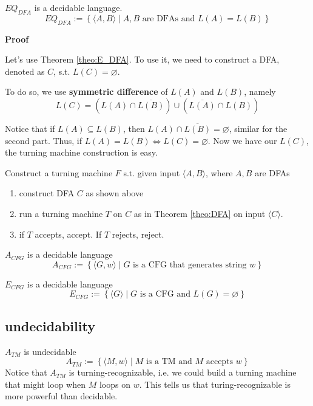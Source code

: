 \documentclass[a4paper]{article}
\begin{document}
\begin{Theorem}{$EQ_{DFA}$ is a decidable language.}{}
	\[
		EQ_{DFA} := \left\{ \langle A,B \rangle \mid A,B \text{ are DFAs and } L(A) = L(B)  \right\} 
	\] 
\end{Theorem}

\textbf{Proof}

Let's use Theorem \ref{theo:E_DFA}. To use it, we need to construct a DFA, denoted as $C$, s.t. $L(C) = \varnothing$.

To do so, we use \textbf{symmetric difference} of $L(A)$ and  $L(B)$, namely  \[
	L(C) = \left( L(A) \cap \overline{L(B)} \right) \cup \left( \overline{L(A)} \cap L(B) \right)  
\]  

Notice that if $L(A) \subseteq L(B)$, then $L(A) \cap \overline{L(B)} = \varnothing$, similar for the second part. Thus, if $L(A) = L(B) \iff L(C) = \varnothing$. Now we have our $L(C)$, the turning machine construction is easy.

Construct a turning machine  $F$ s.t. given input  $\langle A,B \rangle $, where $A,B$ are DFAs
 \begin{enumerate}
	 \item construct DFA $C$ as shown above
	 \item run a turning machine $T$ on  $C$ as in Theorem \ref{theo:DFA} on input  $\langle C \rangle $.
	\item if $T$ accepts, accept. If  $T$ rejects, reject.
\end{enumerate}

\begin{Theorem}{$A_{CFG}$ is a decidable language}{}
	\[
		A_{CFG} := \left\{ \langle G,w \rangle \mid G \text{ is a CFG that generates string } w \right\} 
	\] 
\end{Theorem}

\begin{Theorem}{$E_{CFG}$ is a decidable language}{}
	\[
		E_{CFG} := \left\{ \langle G \rangle \mid G \text{ is a CFG and } L(G) = \varnothing \right\} 
	\] 
\end{Theorem}

\subsection{undecidability}

\begin{Theorem}{$A_{TM}$ is undecidable}{}
	\[
		A_{TM} := \left\{ \langle M,w \rangle \mid M \text{ is a TM and } M \text{ accepts } w  \right\} 
	\] 
	Notice that $A_{TM}$ is turning-recognizable, i.e. we could build a turning machine that might loop when $M$ loops on  $w$. This tells us that turing-recognizable is more powerful than  decidable.
\end{Theorem}
\end{document}
